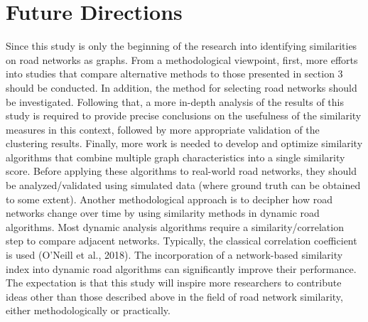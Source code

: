 \section{Future Directions}
Since this study is only the beginning of the research into identifying similarities on road networks as graphs. From a methodological viewpoint, first, more efforts into studies that compare alternative methods to those presented in section 3 should be conducted. In addition, the method for selecting road networks should be investigated. Following that, a more in-depth analysis of the results of this study is required to provide precise conclusions on the usefulness of the similarity measures in this context, followed by more appropriate validation of the clustering results. Finally, more work is needed to develop and optimize similarity algorithms that combine multiple graph characteristics into a single similarity score. Before applying these algorithms to real-world road networks, they should be analyzed/validated using simulated data (where ground truth can be obtained to some extent). Another methodological approach is to decipher how road networks change over time by using similarity methods in dynamic road algorithms. Most dynamic analysis algorithms require a similarity/correlation step to compare adjacent networks. Typically, the classical correlation coefficient is used (O'Neill et al., 2018). The incorporation of a network-based similarity index into dynamic road algorithms can significantly improve their performance.
The expectation is that this study will inspire more researchers to contribute ideas other than those described above in the field of road network similarity, either methodologically or practically.